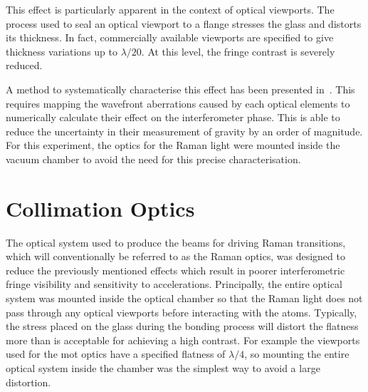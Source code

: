 \par\noindent
This effect is particularly apparent in the context of optical
viewports. The process used to seal an optical viewport to a flange
stresses the glass and distorts its thickness. In fact, commercially
available viewports are specified to give thickness variations up
to $\lambda/20$. At this level, the fringe contrast is severely
reduced.
\par\noindent
A method to systematically characterise this effect has been presented
in~\cite{Schkolnik2015a}. This requires mapping the wavefront
aberrations caused by each optical elements to numerically calculate
their effect on the interferometer phase. This is able to reduce the
uncertainty in their measurement of gravity by an order of
magnitude. For this experiment, the optics for the Raman light were
mounted inside the vacuum chamber to avoid the need for this precise
characterisation. 
\section{Collimation Optics}\label{sec:setup_ramanoptics}
The optical system used to produce the beams for driving Raman transitions,
which will conventionally be referred to as the Raman optics, was designed to
reduce the previously mentioned effects which result in poorer interferometric
fringe visibility and sensitivity to accelerations. Principally, the entire
optical system was mounted inside the optical chamber so that the Raman light
does not pass through any optical viewports before interacting with the atoms.
Typically, the stress placed on the glass during the bonding process will
distort the flatness more than is acceptable for achieving a high contrast. For
example the viewports used for the \ac{mot} optics have a specified flatness of
\(\lambda/4\), so mounting the entire optical system inside the chamber was the
simplest way to avoid a large distortion. 
